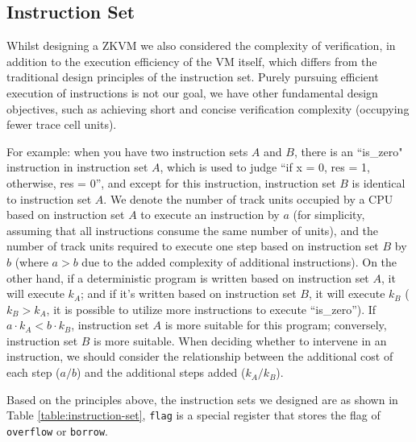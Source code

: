 \subsection{Instruction Set} \label{subsec:instruction-set}

Whilst designing a ZKVM we also considered the complexity of verification, in addition to the execution efficiency of the VM itself, which differs from the traditional design principles of the instruction set. Purely pursuing efficient execution of instructions is not our goal, we have other fundamental design objectives, such as achieving short and concise verification complexity (occupying fewer trace cell units).

For example: when you have two instruction sets $A$ and $B$, there is an ``is\_zero" instruction in instruction set $A$, which is used to judge ``if x = 0, res = 1, otherwise, res = 0”, and except for this instruction, instruction set $B$ is identical to instruction set $A$. We denote the number of track units occupied by a CPU based on instruction set $A$ to execute an instruction by $a$ (for simplicity, assuming that all instructions consume the same number of units), and the number of track units required to execute one step based on instruction set $B$ by $b$ (where $a>b$ due to the added complexity of additional instructions). On the other hand, if a deterministic program is written based on instruction set $A$, it will execute $k_A$; and if it's written based on instruction set $B$, it will execute $k_B$ ($k_B>k_A$, it is possible to utilize more instructions to execute ``is\_zero”). If $a \cdot k_A < b \cdot k_B$, instruction set $A$ is more suitable for this program; conversely, instruction set $B$ is more suitable. When deciding whether to intervene in an instruction, we should consider the relationship between the additional cost of each step ($a/b$) and the additional steps added ($k_A/k_B$).

Based on the principles above, the instruction sets we designed are as shown in Table \ref{table:instruction-set}, \verb|flag| is a special register that stores the flag of \verb|overflow| or \verb|borrow|.


